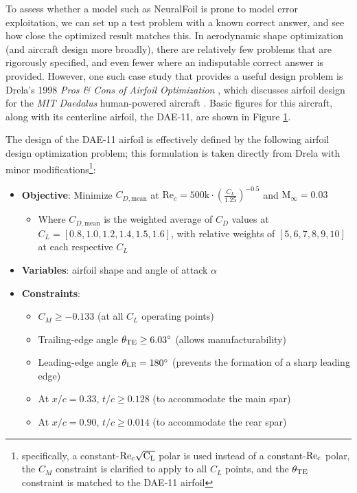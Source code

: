 \documentclass[conf]{new-aiaa}
\begin{document}
    To assess whether a model such as NeuralFoil is prone to model error exploitation, we can set up a test problem with a known correct answer, and see how close the optimized result matches this. In aerodynamic shape optimization (and aircraft design more broadly), there are relatively few problems that are rigorously specified, and even fewer where an indisputable correct answer is provided. However, one such case study that provides a useful design problem is Drela's 1998 \textit{Pros \& Cons of Airfoil Optimization} \cite{drela_pros_1998}, which discusses airfoil design for the \emph{MIT Daedalus} human-powered aircraft \cite{langford_feasibility_1986, langford_daedalus_1989, drela_humanpowered_1985}. Basic figures for this aircraft, along with its centerline airfoil, the DAE-11, are shown in Figure \ref{fig:daedalus_iso}.

    \begin{figure}[h]
        \centering
        
        \caption{}
        \label{fig:daedalus_iso}
    \end{figure}

    The design of the DAE-11 airfoil is effectively defined by the following airfoil design optimization problem; this formulation is taken directly from Drela \cite{drela_pros_1998} with minor modifications\footnote{specifically, a constant-$\rm Re_c \sqrt{C_L}$ polar is used instead of a constant-$\rm Re_c$ polar, the $C_M$ constraint is clarified to apply to all $C_L$ points, and the $\theta_{\rm TE}$ constraint is matched to the DAE-11 airfoil}:

    \begin{itemize}
        \item \textbf{Objective}: Minimize $C_{D, \mathrm{mean}}$ at $\mathrm{Re}_c = 500\mathrm{k} \cdot \left(\frac{C_L}{1.25}\right)^{-0.5}$ and $\mathrm{M}_\infty = 0.03$
        \begin{itemize}
            \item Where $C_{D, \mathrm{mean}}$ is the weighted average of $C_D$ values at $C_L = [0.8, 1.0, 1.2, 1.4, 1.5, 1.6]$, with relative weights of $[5, 6, 7, 8, 9, 10]$ at each respective $C_L$
        \end{itemize}
        \item \textbf{Variables}: airfoil shape and angle of attack $\alpha$
        \item \textbf{Constraints}:
        \begin{itemize}
            \item $C_M \geq -0.133$ (at all $C_L$ operating points)
            \item Trailing-edge angle $\theta_{\rm TE} \geq 6.03^\circ$ (allows manufacturability)
            \item Leading-edge angle $\theta_{\rm LE} = 180^\circ$ (prevents the formation of a sharp leading edge)
            \item At $x/c = 0.33$, $t/c \geq 0.128$ (to accommodate the main spar)
            \item At $x/c = 0.90$, $t/c \geq 0.014$ (to accommodate the rear spar)
        \end{itemize}
    \end{itemize}
\end{document}
